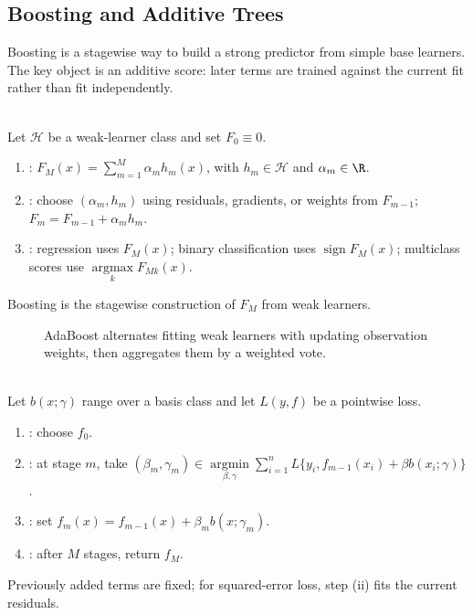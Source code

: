 \subsection{Boosting and Additive Trees} \label{subsec:sl-boosting-additive-trees}

Boosting is a stagewise way to build a strong predictor from simple base learners.  The key object is an additive score: later terms are trained against the current fit rather than fit independently.

\begin{definition} \label{def:sl-boosting} \\
Let $\mathcal H$ be a weak-learner class and set $F_0\equiv0$.
\begin{enumerate}[label=(\roman*)]
\setlength{\itemsep}{0pt}
\item {}: $F_M(x)=\sum\limits_{m=1}^M\alpha_m h_m(x)$, with $h_m\in\mathcal H$ and $\alpha_m\in\R$.
\item {}: choose $(\alpha_m,h_m)$ using residuals, gradients, or weights from $F_{m-1}$; $F_m=F_{m-1}+\alpha_mh_m$.
\item {}: regression uses $F_M(x)$; binary classification uses $\operatorname{sign}F_M(x)$; multiclass scores use $\operatorname*{argmax}\limits_k F_{Mk}(x)$.
\end{enumerate}
Boosting is the stagewise construction of $F_M$ from weak learners.
\end{definition}

\begin{figure}[H]
\centering

\caption{AdaBoost alternates \textcolor{blue!70!black}{fitting weak learners} with \textcolor{red!65!black}{updating observation weights}, then \textcolor{orange!80!black}{aggregates} them by a weighted vote.}
\label{fig:sl-adaboost-weighted-samples}
\end{figure}

\begin{method} \label{meth:sl-forward-stagewise-additive-modeling} \\
Let $b(x;\gamma)$ range over a basis class and let $L(y,f)$ be a pointwise loss.
\begin{enumerate}[label=(\roman*)]
\setlength{\itemsep}{0pt}
\item {}: choose $f_0$.
\item {}: at stage $m$, take $(\beta_m,\gamma_m)\in\operatorname*{argmin}\limits_{\beta,\gamma}\sum\limits_{i=1}^n L\{y_i,f_{m-1}(x_i)+\beta b(x_i;\gamma)\}$.
\item {}: set $f_m(x)=f_{m-1}(x)+\beta_m b(x;\gamma_m)$.
\item {}: after $M$ stages, return $f_M$.
\end{enumerate}
Previously added terms are fixed; for squared-error loss, step (ii) fits the current residuals.
\end{method}

